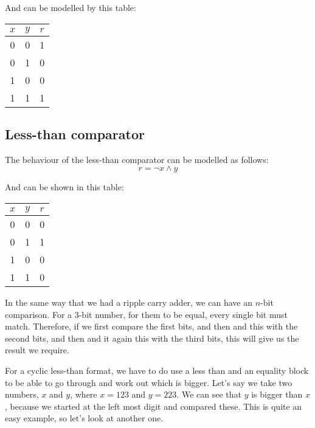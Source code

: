 \documentclass[11pt,a4paper,titlepage,dvipsnames,cmyk]{scrartcl}
\begin{document}
And can be modelled by this table:
\begin{center}
    \begin{tabular}{|c c|c|}
        \hline
        $x$ & $y$ & $r$ \\ \hline
        0 & 0 & 1 \\ \hline
        0 & 1 & 0 \\ \hline
        1 & 0 & 0 \\ \hline
        1 & 1 & 1 \\ \hline
    \end{tabular}
\end{center}

\subsection{Less-than comparator}%
\label{sub:less-than}

The behaviour of the less-than comparator can be modelled as follows:
\begin{equation*}
    r = \neg x \wedge y
\end{equation*}

And can be shown in this table:
\begin{center}
    \begin{tabular}{|c c|c|}
        \hline
        $x$ & $y$ & $r$ \\ \hline
        0 & 0 & 0 \\ \hline
        0 & 1 & 1 \\ \hline
        1 & 0 & 0 \\ \hline
        1 & 1 & 0 \\ \hline
    \end{tabular}
\end{center}

In the same way that we had a ripple carry adder, we can have an $n$-bit
comparison. For a 3-bit number, for them to be equal, every single bit
must match. Therefore, if we first compare the first bits, and then and
this with the second bits, and then and it again this with the third bits,
this will give us the result we require.

For a cyclic less-than format, we have to do use a less than and an
equality block to be able to go through and work out which is bigger.
Let's say we take two numbers, $x$ and $y$, where $x = 123$ and $y = 223$.
We can see that $y$ is bigger than $x$, because we started at the left
most digit and compared these. This is quite an easy example, so let's
look at another one.
\end{document}

